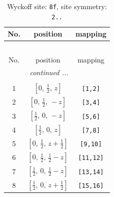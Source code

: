 \documentclass[fleqn,8pt]{jsarticle}
\begin{document}
\begin{longtable}{ccc}
\caption{Wyckoff site: {\tt 8f}, site symmetry: {\tt 2..}}
 \\
 \hline \hline
No. & position & mapping \\ \hline \endfirsthead

\multicolumn{2}{l}{\tablename\ \thetable{}} \\
 \hline \hline
No. & position & mapping \\ \hline \endhead

 \hline \hline
\multicolumn{2}{r}{\footnotesize\it continued ...} \\ \endfoot

 \hline \hline
\multicolumn{2}{r}{} \\ \endlastfoot

1 & $\left[ 0,\, \frac{1}{2},\, z \right]$ & {\tt [1,2]} \\ \hline
2 & $\left[ 0,\, \frac{1}{2},\, - z \right]$ & {\tt [3,4]} \\ \hline
3 & $\left[ \frac{1}{2},\, 0,\, - z \right]$ & {\tt [5,6]} \\ \hline
4 & $\left[ \frac{1}{2},\, 0,\, z \right]$ & {\tt [7,8]} \\ \hline
5 & $\left[ 0,\, \frac{1}{2},\, z + \frac{1}{2} \right]$ & {\tt [9,10]} \\ \hline
6 & $\left[ 0,\, \frac{1}{2},\, \frac{1}{2} - z \right]$ & {\tt [11,12]} \\ \hline
7 & $\left[ \frac{1}{2},\, 0,\, \frac{1}{2} - z \right]$ & {\tt [13,14]} \\ \hline
8 & $\left[ \frac{1}{2},\, 0,\, z + \frac{1}{2} \right]$ & {\tt [15,16]} \\
\end{longtable}
\renewcommand{\arraystretch}{1.2}
\end{document}
